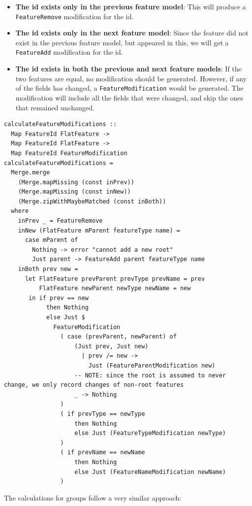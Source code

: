 \documentclass[a4paper,english]{ifimaster}
\begin{document}
\begin{itemize}
  \item \textbf{The id exists only in the previous feature model}: This will produce a \texttt{FeatureRemove} modification for the id.
  \item \textbf{The id exists only in the next feature model}: Since the feature did not exist in the previous feature model, but appeared in this, we will get a \texttt{FeatureAdd} modification for the id.
  \item \textbf{The id exists in both the previous and next feature models}: If the two features are equal, no modification should be generated. However, if any of the fields has changed, a \texttt{FeatureModification} would be generated. The modification will include all the fields that were changed, and skip the ones that remained unchanged.
\end{itemize}

\begin{verbatim}
calculateFeatureModifications ::
  Map FeatureId FlatFeature ->
  Map FeatureId FlatFeature ->
  Map FeatureId FeatureModification
calculateFeatureModifications =
  Merge.merge
    (Merge.mapMissing (const inPrev))
    (Merge.mapMissing (const inNew))
    (Merge.zipWithMaybeMatched (const inBoth))
  where
    inPrev _ = FeatureRemove
    inNew (FlatFeature mParent featureType name) =
      case mParent of
        Nothing -> error "cannot add a new root"
        Just parent -> FeatureAdd parent featureType name
    inBoth prev new =
      let FlatFeature prevParent prevType prevName = prev
          FlatFeature newParent newType newName = new
       in if prev == new
            then Nothing
            else Just $
              FeatureModification
                ( case (prevParent, newParent) of
                    (Just prev, Just new)
                      | prev /= new ->
                        Just (FeatureParentModification new)
                    -- NOTE: since the root is assumed to never change, we only record changes of non-root features
                    _ -> Nothing
                )
                ( if prevType == newType
                    then Nothing
                    else Just (FeatureTypeModification newType)
                )
                ( if prevName == newName
                    then Nothing
                    else Just (FeatureNameModification newName)
                )
\end{verbatim}

The calculations for groups follow a very similar approach:
\end{document}
